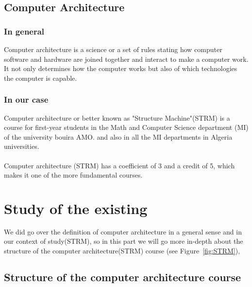 \subsection{Computer Architecture}
\subsubsection{In general}
Computer architecture is a science or a set of rules stating how computer software and hardware are 
joined together and interact to make a computer work. It not only determines how the computer works 
but also of which technologies the computer is capable.\cite{Pam2018-so}
\subsubsection{In our case}
Computer architecture or better known as "Structure Machine"(STRM) is a course for first-year 
students in the Math and Computer Science department (MI) 
of the university bouira AMO. and also in all the MI departments in Algeria universities.\\ \\
\indent Computer architecture (STRM) has a coefficient of 3 and a credit of 5, which makes it one of the more fundamental courses.

\section{Study of the existing}
We did go over the definition of computer architecture in a general sense and in our context of study(STRM),
so in this part we will go more in-depth about the structure of the computer architecture(STRM) course (see Figure~\ref{fig:STRM}), 

\subsection{Structure of the computer architecture course}


